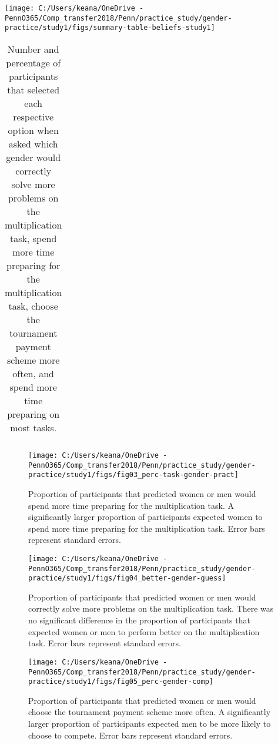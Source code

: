 \documentclass[letterpaper, nobind]{templates/ociamthesis}
\begin{document}
\begin{center}\texttt{[image: C:/Users/keana/OneDrive - PennO365/Comp\_transfer2018/Penn/practice\_study/gender-practice/study1/figs/summary-table-beliefs-study1]} \end{center}

\begin{table}[ht]
\centering
\begingroup\fontsize{0.1pt}{0.1pt}\selectfont
\begin{tabular}{r}
   \\ 
 \end{tabular}
\endgroup
\caption{Number and percentage of participants that selected each respective option when asked which gender would correctly solve more problems on the multiplication task, spend more time preparing for the multiplication task, choose the tournament payment scheme more often, and spend more time preparing on most tasks.} 
\label{tab:summary-table-beliefs-study1}
\end{table}

\begin{figure}

{\centering \texttt{[image: C:/Users/keana/OneDrive - PennO365/Comp\_transfer2018/Penn/practice\_study/gender-practice/study1/figs/fig03\_perc-task-gender-pract]} 

}

\caption{Proportion of participants that predicted women or men would spend more time preparing for the multiplication task. A significantly larger proportion of participants expected women to spend more time preparing for the multiplication task. Error bars represent standard errors.}\label{fig:s103}
\end{figure}

\begin{figure}

{\centering \texttt{[image: C:/Users/keana/OneDrive - PennO365/Comp\_transfer2018/Penn/practice\_study/gender-practice/study1/figs/fig04\_better-gender-guess]} 

}

\caption{Proportion of participants that predicted women or men would correctly solve more problems on the multiplication task. There was no significant difference in the proportion of participants that expected women or men to perform better on the multiplication task. Error bars represent standard errors.}\label{fig:s104}
\end{figure}

\begin{figure}

{\centering \texttt{[image: C:/Users/keana/OneDrive - PennO365/Comp\_transfer2018/Penn/practice\_study/gender-practice/study1/figs/fig05\_perc-gender-comp]} 

}

\caption{Proportion of participants that predicted women or men would choose the tournament payment scheme more often. A significantly larger proportion of participants expected men to be more likely to choose to compete. Error bars represent standard errors.}\label{fig:s105}
\end{figure}
\end{document}
